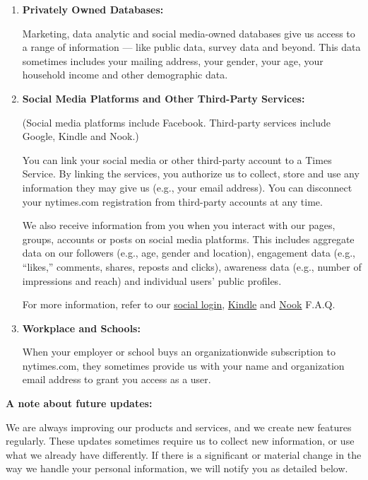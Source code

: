 \begin{enumerate}
\def\labelenumi{\arabic{enumi}.}
\item
  \textbf{Privately Owned Databases:}

  Marketing, data analytic and social media-owned databases give us
  access to a range of information --- like public data, survey data and
  beyond. This data sometimes includes your mailing address, your
  gender, your age, your household income and other demographic data.
\item
  \textbf{Social Media Platforms and Other Third-Party Services:}

  (Social media platforms include Facebook. Third-party services include
  Google, Kindle and Nook.)

  You can link your social media or other third-party account to a Times
  Service. By linking the services, you authorize us to collect, store
  and use any information they may give us (e.g., your email address).
  You can disconnect your nytimes.com registration from third-party
  accounts at any time.

  We also receive information from you when you interact with our pages,
  groups, accounts or posts on social media platforms. This includes
  aggregate data on our followers (e.g., age, gender and location),
  engagement data (e.g., ``likes,'' comments, shares, reposts and
  clicks), awareness data (e.g., number of impressions and reach) and
  individual users' public profiles.

  For more information, refer to our
  \href{https://help.nytimes.com/hc/en-us/articles/115014887628-Social-login}{social
  login},
  \href{https://help.nytimes.com/hc/en-us/articles/115014889068-Kindle-subscribers}{Kindle}
  and
  \href{https://help.nytimes.com/hc/en-us/articles/115014917867-NOOK-subscribers}{Nook}
  F.A.Q.
\item
  \textbf{Workplace and Schools:}

  When your employer or school buys an organizationwide subscription to
  nytimes.com, they sometimes provide us with your name and organization
  email address to grant you access as a user.
\end{enumerate}

\textbf{A note about future updates:}

We are always improving our products and services, and we create new
features regularly. These updates sometimes require us to collect new
information, or use what we already have differently. If there is a
significant or material change in the way we handle your personal
information, we will notify you as detailed below.

